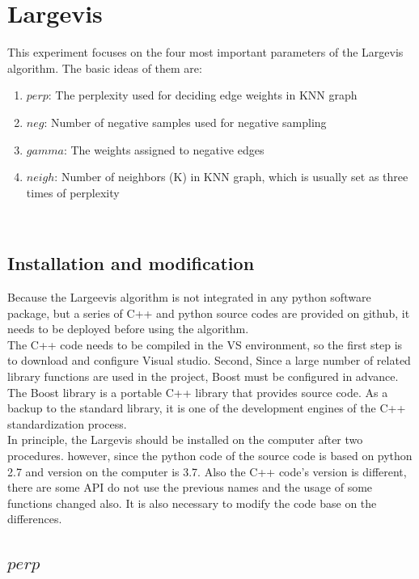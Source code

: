 \section{Largevis}

This experiment focuses on the four most important parameters of the Largevis algorithm. The basic ideas of them are:

\begin{enumerate}[1)]
\item $perp$: The perplexity used for deciding edge weights in KNN graph
\item $neg$: Number of negative samples used for negative sampling
\item $gamma$: The weights assigned to negative edges
\item $neigh$: Number of neighbors (K) in KNN graph, which is usually set as three times of perplexity
\end{enumerate}\\

\subsection{Installation and modification}

Because the Largeevis algorithm is not integrated in any python software package, but a series of C++ and python source codes are provided on github, it needs to be deployed before using the algorithm. \\

\noindent The C++ code needs to be compiled in the VS environment, so the first step is to download and configure Visual studio. Second, Since a large number of related library functions are used in the project, Boost must be configured in advance. The Boost library is a portable C++ library that provides source code. As a backup to the standard library, it is one of the development engines of the C++ standardization process.\\

\noindent In principle, the Largevis should be installed on the computer after two procedures. however, since the python code of the source code is based on python 2.7 and version on the computer is 3.7. Also the C++ code's version is different, there are some API do not use the previous names and the usage of some functions changed also. It is also necessary to modify the code base on the differences. 

\subsection{$perp$}

